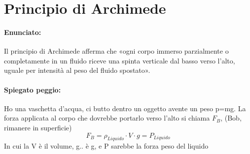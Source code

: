 \documentclass[12pt, a4paper, openany, oneside]{book}
\begin{document}
\section{Principio di Archimede}
\paragraph{Enunciato: }Il principio di Archimede afferma che «ogni corpo immerso 
parzialmente o completamente in un fluido riceve una spinta verticale dal basso
 verso l'alto, uguale per intensità al peso del fluido spostato».
 \paragraph{Spiegato peggio: }
 Ho una vaschetta d'acqua, ci butto dentro un oggetto avente un peso p=mg. La 
 forza applicata al corpo che dovrebbe portarlo verso l'alto si chiama $F_{B}$,
 (Bob, rimanere in superficie)
 \[
 	F_{B} = \rho _{Liquido} \cdot V \cdot g = P_{Liquido}
 \]
 In cui la V è il volume, g.. è g, e P sarebbe la forza peso del liquido

 	     	
            
\end{document}
